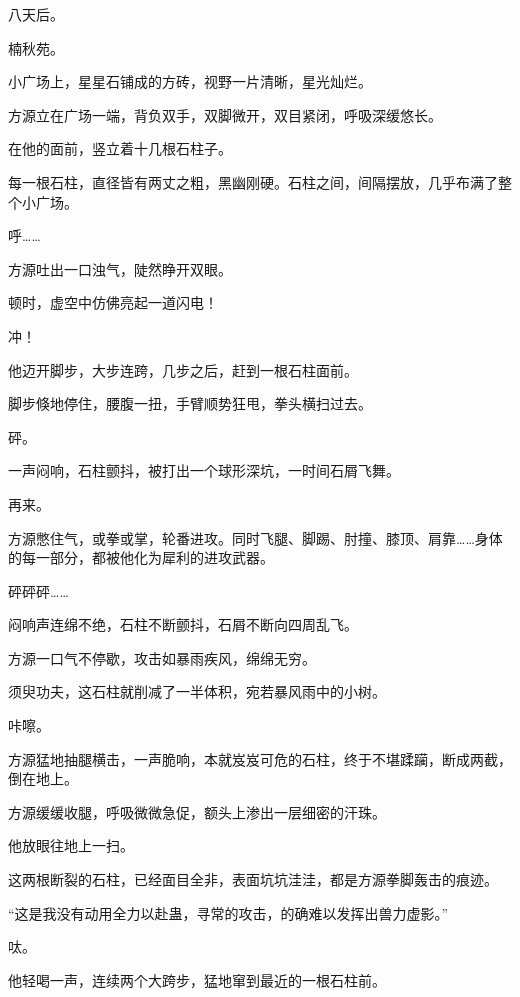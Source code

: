 
\begin{this_body}



八天后。

楠秋苑。

小广场上，星星石铺成的方砖，视野一片清晰，星光灿烂。

方源立在广场一端，背负双手，双脚微开，双目紧闭，呼吸深缓悠长。

在他的面前，竖立着十几根石柱子。

每一根石柱，直径皆有两丈之粗，黑幽刚硬。石柱之间，间隔摆放，几乎布满了整个小广场。

呼……

方源吐出一口浊气，陡然睁开双眼。

顿时，虚空中仿佛亮起一道闪电！

冲！

他迈开脚步，大步连跨，几步之后，赶到一根石柱面前。

脚步倏地停住，腰腹一扭，手臂顺势狂甩，拳头横扫过去。

砰。

一声闷响，石柱颤抖，被打出一个球形深坑，一时间石屑飞舞。

再来。

方源憋住气，或拳或掌，轮番进攻。同时飞腿、脚踢、肘撞、膝顶、肩靠……身体的每一部分，都被他化为犀利的进攻武器。

砰砰砰……

闷响声连绵不绝，石柱不断颤抖，石屑不断向四周乱飞。

方源一口气不停歇，攻击如暴雨疾风，绵绵无穷。

须臾功夫，这石柱就削减了一半体积，宛若暴风雨中的小树。

咔嚓。

方源猛地抽腿横击，一声脆响，本就岌岌可危的石柱，终于不堪蹂躏，断成两截，倒在地上。

方源缓缓收腿，呼吸微微急促，额头上渗出一层细密的汗珠。

他放眼往地上一扫。

这两根断裂的石柱，已经面目全非，表面坑坑洼洼，都是方源拳脚轰击的痕迹。

“这是我没有动用全力以赴蛊，寻常的攻击，的确难以发挥出兽力虚影。”

呔。

他轻喝一声，连续两个大跨步，猛地窜到最近的一根石柱前。


\end{this_body}
